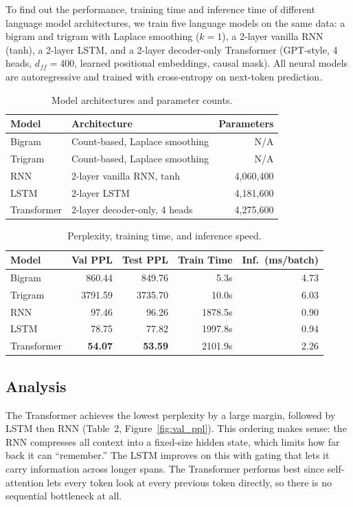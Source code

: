 \documentclass[11pt,a4paper]{article}
\begin{document}
To find out the performance, training time and inference time of different language model architectures, we train five language models on the same data: a bigram and trigram with Laplace smoothing ($k{=}1$), a 2-layer vanilla RNN (tanh), a 2-layer LSTM, and a 2-layer decoder-only Transformer (GPT-style, 4 heads, $d_{ff}{=}400$, learned positional embeddings, causal mask). All neural models are autoregressive and trained with cross-entropy on next-token prediction.

\begin{table}[H]
\centering\small
\begin{tabular}{llr}
\toprule
\textbf{Model} & \textbf{Architecture} & \textbf{Parameters} \\
\midrule
Bigram & Count-based, Laplace smoothing & N/A \\
Trigram & Count-based, Laplace smoothing & N/A \\
RNN & 2-layer vanilla RNN, tanh & 4,060,400 \\
LSTM & 2-layer LSTM & 4,181,600 \\
Transformer & 2-layer decoder-only, 4 heads & 4,275,600 \\
\bottomrule
\end{tabular}
\caption{Model architectures and parameter counts.}
\end{table}

\begin{table}[H]
\centering\small
\begin{tabular}{lrrrr}
\toprule
\textbf{Model} & \textbf{Val PPL} & \textbf{Test PPL} & \textbf{Train Time} & \textbf{Inf.\ (ms/batch)} \\
\midrule
Bigram & 860.44 & 849.76 & 5.3s & 4.73 \\
Trigram & 3791.59 & 3735.70 & 10.0s & 6.03 \\
RNN & 97.46 & 96.26 & 1878.5s & 0.90 \\
LSTM & 78.75 & 77.82 & 1997.8s & 0.94 \\
Transformer & \textbf{54.07} & \textbf{53.59} & 2101.9s & 2.26 \\
\bottomrule
\end{tabular}
\caption{Perplexity, training time, and inference speed.}
\end{table}

\subsection*{Analysis}

The Transformer achieves the lowest perplexity by a large margin, followed by LSTM then RNN (Table~2, Figure~\ref{fig:val_ppl}). This ordering makes sense: the RNN compresses all context into a fixed-size hidden state, which limits how far back it can ``remember.'' The LSTM improves on this with gating that lets it carry information across longer spans. The Transformer performs best since self-attention lets every token look at every previous token directly, so there is no sequential bottleneck at all.
\end{document}
